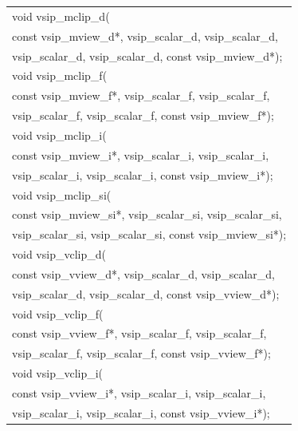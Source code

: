 \\\cvsiplh
\afh
{
\ttfamily
\\\hspace*{.04\textwidth}\begin{tabular}[H]{l}
void vsip\_mclip\_d(\\*\hspace*{1cm}const vsip\_mview\_d*, vsip\_scalar\_d, vsip\_scalar\_d,\\*\hspace*{1cm}vsip\_scalar\_d, vsip\_scalar\_d, const vsip\_mview\_d*);\\
void vsip\_mclip\_f(\\*\hspace*{1cm}const vsip\_mview\_f*, vsip\_scalar\_f, vsip\_scalar\_f,\\*\hspace*{1cm}vsip\_scalar\_f, vsip\_scalar\_f, const vsip\_mview\_f*);\\
void vsip\_mclip\_i(\\*\hspace*{1cm}const vsip\_mview\_i*, vsip\_scalar\_i, vsip\_scalar\_i,\\*\hspace*{1cm}vsip\_scalar\_i, vsip\_scalar\_i, const vsip\_mview\_i*);\\
void vsip\_mclip\_si(\\*\hspace*{1cm}const vsip\_mview\_si*, vsip\_scalar\_si, vsip\_scalar\_si,\\*\hspace*{1cm}vsip\_scalar\_si, vsip\_scalar\_si, const vsip\_mview\_si*);\\
void vsip\_vclip\_d(\\*\hspace*{1cm}const vsip\_vview\_d*, vsip\_scalar\_d, vsip\_scalar\_d,\\*\hspace*{1cm}vsip\_scalar\_d, vsip\_scalar\_d, const vsip\_vview\_d*);\\
void vsip\_vclip\_f(\\*\hspace*{1cm}const vsip\_vview\_f*, vsip\_scalar\_f, vsip\_scalar\_f,\\*\hspace*{1cm}vsip\_scalar\_f, vsip\_scalar\_f, const vsip\_vview\_f*);\\
void vsip\_vclip\_i(\\*\hspace*{1cm}const vsip\_vview\_i*, vsip\_scalar\_i, vsip\_scalar\_i,\\*\hspace*{1cm}vsip\_scalar\_i, vsip\_scalar\_i, const vsip\_vview\_i*);\\

\end{tabular}}

